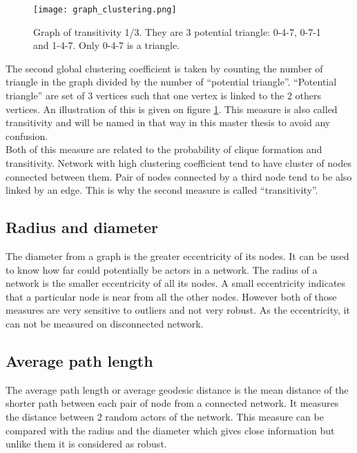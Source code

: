 \documentclass[a4paper, 12pt]{report}
\begin{document}
\begin{figure}
\centering
\texttt{[image: graph\_clustering.png]}
\caption{Graph of transitivity 1/3. They are 3 potential triangle: 0-4-7, 0-7-1 and 1-4-7. Only 0-4-7 is a triangle. }
\label{transitivity}
\end{figure}

The second global clustering coefficient is taken by counting the number of triangle in the graph divided by the number of ``potential triangle''. ``Potential triangle'' are set of 3 vertices such that one vertex is linked to the 2 others vertices. An illustration of this is given on figure \ref{transitivity}. This measure is also called  transitivity and will be named in that way in this master thesis to avoid any confusion. \\

Both of this measure are related to the probability of clique formation and transitivity. Network with high clustering coefficient tend to have cluster of nodes connected between them. Pair of nodes connected by a third node tend to be also linked by an edge. This is why the second measure is called ``transitivity''.\\

\subsection{Radius and diameter}
The diameter from a graph is the greater eccentricity of its nodes. It can be used to know how far could potentially be actors in a network. The radius of a network is the smaller eccentricity of all its nodes. A small eccentricity indicates that a particular node is  near from all the other nodes. However both of those measures are very sensitive to outliers and not very robust. As the eccentricity, it can not be measured on disconnected network.

\subsection{Average path length}
The average path length \citep{path_length} or average geodesic distance is the mean distance of the shorter path between each pair of node from a connected network. It measures the distance between 2 random actors of the network. This measure can be compared with the radius and the diameter which gives close information but unlike them it is considered as robust.
 
\end{document}
